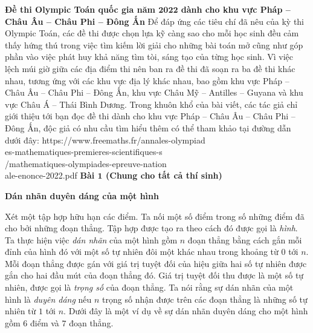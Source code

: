 \begin{multicols}{2}
	\vskip 0.1cm
	\textbf{\color{cackithi}Đề thi Olympic Toán quốc gia năm $\pmb{2022}$ dành cho khu vực Pháp -- Châu Âu -- Châu Phi -- Đông Ấn} 
	\vskip 0.1cm
	Để đáp ứng các tiêu chí đã nêu của kỳ thi Olympic Toán, các đề thi được chọn lựa kỹ càng sao cho mỗi học sinh đều cảm thấy hứng thú trong việc tìm kiếm lời giải cho những bài toán mở cũng như góp phần vào việc phát huy khả năng tìm tòi, sáng tạo của từng học sinh. Vì việc lệch múi giờ giữa các địa điểm thi nên ban ra đề thi đã soạn ra ba đề thi khác nhau, tương ứng với các khu vực địa lý khác nhau, bao gồm khu vực Pháp -- Châu Âu -- Châu Phi -- Đông Ấn, khu vực  Châu Mỹ -- Antilles -- Guyana và khu vực  Châu Á -- Thái Bình Dương. Trong khuôn khổ của bài viết, các tác giả chỉ giới thiệu tới bạn đọc đề thi dành cho khu vực Pháp -- Châu Âu -- Châu Phi -- Đông Ấn, độc giả có nhu cầu tìm hiểu thêm có thể tham khảo tại đường dẫn dưới đây:
	\vskip 0.1cm
	https://www.freemaths.fr/annales-olympiad\\es-mathematiques-premieres-scientifiques-s\\/mathematiques-olympiades-epreuve-nation\\ale-enonce-2022.pdf
	\vskip 0.1cm
	\textbf{\color{cackithi}Bài $\pmb{1}$ (Chung cho tất cả thí sinh)}
	\vskip 0.1cm
	\begin{center}
		\textbf{\color{cackithi}Dán nhãn duyên dáng của một hình}
	\end{center}
	Xét một tập hợp hữu hạn các điểm. Ta nối một số điểm trong số những điểm đã cho bởi những đoạn thẳng. Tập hợp được tạo ra theo cách đó được gọi là \textit{hình}.
	\vskip 0.1cm 
	Ta thực hiện việc \textit{dán nhãn} của một hình gồm $n$ đoạn thẳng bằng cách gắn mỗi đỉnh của hình đó với một số tự nhiên đôi một khác nhau trong khoảng từ $0$ tới $n$.
	\vskip 0.1cm 
	Mỗi đoạn thẳng được gán với giá trị tuyệt đối của hiệu giữa hai số tự nhiên được gắn cho hai đầu mút của đoạn thẳng đó. Giá trị tuyệt đối thu được là một số tự nhiên, được gọi là \textit{trọng số} của đoạn thẳng. 
	\vskip 0.1cm
	Ta nói rằng sự dán nhãn của một hình là \textit{duyên dáng} nếu $n$ trọng số nhận được trên các đoạn thẳng là những số tự nhiên từ $1$ tới $n$.
	\vskip 0.1cm 
	Dưới đây là một ví dụ về sự dán nhãn duyên dáng cho một hình gồm $6$ điểm và $7$ đoạn thẳng.	
	\begin{figure}[H]
		\vspace*{-5pt}
		\centering
		\captionsetup{labelformat= empty, justification=centering}
\end{figure}
\end{multicols}
